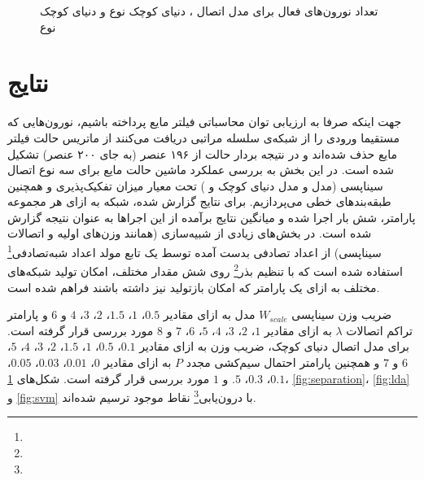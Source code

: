 \begin{figure}
\centering
{\footnotesize
{}

\caption[تعداد نورون‌های فعال برای مدل‌های اتصال]{تعداد نورون‌های فعال برای مدل اتصال  ،  دنیای کوچک نوع  و   دنیای کوچک نوع }
\label{fig:active}
}
\end{figure}

\section{نتایج}
جهت اینکه صرفا به ارزیابی توان محاسباتی فیلتر مایع پرداخته باشیم، نورون‌هایی که مستقیما ورودی را از شبکه‌ی سلسله مراتبی دریافت می‌کنند از ماتریس حالت فیلتر مایع حذف شده‌اند و در نتیجه بردار حالت  از ۱۹۶ عنصر (به جای ۲۰۰ عنصر) تشکیل شده است. در این بخش به بررسی عملکرد ماشین حالت مایع برای سه نوع اتصال سیناپسی (مدل  و مدل دنیای کوچک  و ) تحت معیار میزان تفکیک‌پذیری و همچنین طبقه‌بندهای خطی می‌پردازیم. برای نتایج گزارش شده، شبکه به ازای هر مجموعه پارامتر، شش بار اجرا شده و میانگین نتایج برآمده از این اجراها به عنوان نتیجه گزارش شده است. در بخش‌های زیادی از شبیه‌سازی (همانند وزن‌های اولیه و اتصالات سیناپسی) از اعداد تصادفی بدست آمده توسط یک تابع مولد اعداد شبه‌تصادفی\footnote{} استفاده شده است که با تنظیم بذر\footnote{} روی شش مقدار مختلف، امکان تولید شبکه‌های مختلف به ازای یک پارامتر که امکان بازتولید نیز داشته باشند فراهم شده است.

ضریب وزن سیناپسی $W_{scale}$ مدل  به ازای مقادیر  $0.5$، $1$، $1.5$، $2$، $3$، $4$ و $6$ و پارامتر تراکم اتصالات $\lambda$ به ازای مقادیر $1$، $2$، $3$، $4$، $5$، $6$، $7$ و $8$ مورد بررسی قرار گرفته است. برای مدل اتصال دنیای کوچک، ضریب وزن به ازای مقادیر $0.1$، $0.5$، $1$، $1.5$، $2$، $3$، $4$، $5$، $6$ و $7$ و همچنین پارامتر احتمال سیم‌کشی مجدد $P$ به ازای مقادیر  $0$، $0.01$، $0.03$، $0.05$، $0.1$، $0.3$، $.5$ و $1$ مورد بررسی قرار گرفته است. شکل‌های \ref{fig:active}، \ref{fig:separation}، \ref{fig:lda} و \ref{fig:svm} با درون‌یابی\footnote{} نقاط موجود ترسیم شده‌اند.

